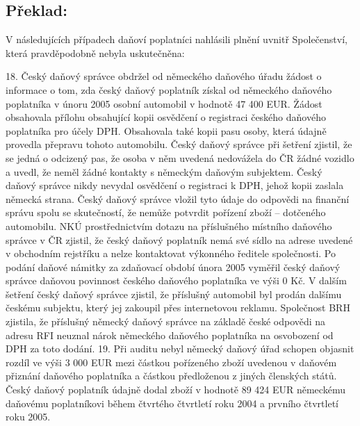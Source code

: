 \documentclass[10pt]{article}
\begin{document}
\pagebreak

\subsection*{Překlad:}



V následujících případech daňoví poplatníci nahlásili plnění uvnitř Společenství, která pravděpodobně nebyla uskutečněna:

18.
Český daňový správce obdržel od německého daňového úřadu žádost o informace o tom, zda český daňový poplatník získal od německého daňového poplatníka v únoru 2005 osobní automobil v hodnotě 47 400 EUR.
Žádost obsahovala přílohu obsahující kopii osvědčení o registraci českého daňového poplatníka pro účely DPH.
Obsahovala také kopii pasu osoby, která údajně provedla přepravu tohoto automobilu.
Český daňový správce při šetření zjistil, že se jedná o odcizený pas, že osoba v něm uvedená nedovážela do ČR žádné vozidlo a uvedl, že neměl žádné kontakty s německým daňovým subjektem.
Český daňový správce nikdy nevydal osvědčení o registraci k DPH, jehož kopii zaslala německá strana.
Český daňový správce vložil tyto údaje do odpovědi na finanční správu spolu se skutečností, že nemůže potvrdit pořízení zboží – dotčeného automobilu.
NKÚ prostřednictvím dotazu na příslušného místního daňového správce v ČR zjistil, že český daňový poplatník nemá své sídlo na adrese uvedené v obchodním rejstříku a nelze kontaktovat výkonného ředitele společnosti.
Po podání daňové námitky za zdaňovací období února 2005 vyměřil český daňový správce daňovou povinnost českého daňového poplatníka ve výši 0 Kč.
V dalším šetření český daňový správce zjistil, že příslušný automobil byl prodán dalšímu českému subjektu, který jej zakoupil přes internetovou reklamu.
Společnost BRH zjistila, že příslušný německý daňový správce na základě české odpovědi na adresu RFI neuznal nárok německého daňového poplatníka na osvobození od DPH za toto dodání.
19. Při auditu nebyl německý daňový úřad schopen objasnit rozdíl ve výši 3 000 EUR mezi částkou pořízeného zboží uvedenou v daňovém přiznání daňového poplatníka a částkou předloženou z jiných členských států.
Český daňový poplatník údajně dodal zboží v hodnotě 89 424 EUR německému daňovému poplatníkovi během čtvrtého čtvrtletí roku 2004 a prvního čtvrtletí roku 2005.
\end{document}
